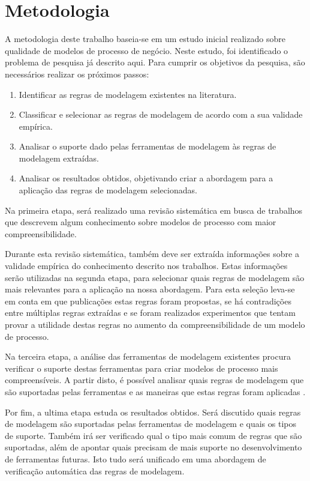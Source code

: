 \documentclass[12pt]{article}
\begin{document}
\newpage
\section{Metodologia}

A metodologia deste trabalho baseia-se em um estudo inicial realizado sobre qualidade de modelos de processo de negócio. Neste estudo, foi identificado o problema de pesquisa já descrito aqui. Para cumprir os objetivos da pesquisa, são necessários realizar os próximos passos:
\begin{enumerate}
	\item Identificar as regras de modelagem existentes na literatura.
	\item Classificar e selecionar as regras de modelagem de acordo com a sua validade empírica.
	\item Analisar o suporte dado pelas ferramentas de modelagem às regras de modelagem extraídas.
	\item Analisar os resultados obtidos, objetivando criar a abordagem para a aplicação das regras de modelagem selecionadas. 
\end{enumerate}

Na primeira etapa, será realizado uma revisão sistemática em busca de trabalhos que descrevem algum conhecimento sobre modelos de processo com maior compreensibilidade. 

Durante esta revisão sistemática, também deve ser extraída informações sobre a validade empírica do conhecimento descrito nos trabalhos. Estas informações serão utilizadas na segunda etapa, para selecionar quais regras de modelagem são mais relevantes para a aplicação na nossa abordagem. Para esta seleção leva-se em conta em que publicações estas regras foram propostas, se há contradições entre múltiplas regras extraídas e se foram realizados experimentos que tentam provar a utilidade destas regras no aumento da compreensibilidade de um modelo de processo.

Na terceira etapa, a análise das ferramentas de modelagem existentes procura verificar o suporte destas ferramentas para criar modelos de processo mais compreensíveis. A partir disto, é possível analisar quais regras de modelagem que são suportadas pelas ferramentas e as maneiras que estas regras foram aplicadas .

Por fim, a ultima etapa estuda os resultados obtidos. Será discutido quais regras de modelagem são suportadas pelas ferramentas de modelagem e quais os tipos de suporte. Também irá ser verificado qual o tipo mais comum de regras que são suportadas, além de apontar quais precisam de mais suporte no desenvolvimento de ferramentas futuras. Isto tudo será unificado em uma abordagem de verificação automática das regras de modelagem.
\end{document}
